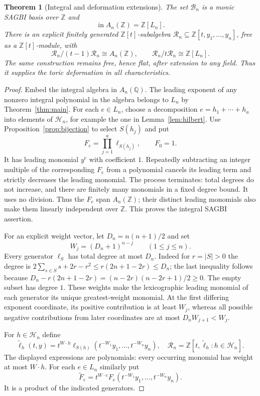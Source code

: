 \documentclass[11pt]{article}
\newtheorem{theorem}{Theorem}[section]
\theoremstyle{definition}
\theoremstyle{remark}
\newcommand{\Z}{\mathbb Z}
\newcommand{\Q}{\mathbb Q}
\newcommand{\inA}{\operatorname{in}}
\begin{document}
\begin{theorem}[Integral and deformation extensions]\label{thm:flat}
The set $\mathcal B_n$ is a monic SAGBI basis over $\Z$ and
\[
 \inA A_n(\Z)=\Z[L_n].
\]
There is an explicit finitely generated $\Z[t]$-subalgebra
$\mathcal R_n\subseteq\Z[t,y_1,\ldots,y_n]$, free as a $\Z[t]$-module,
with
\[
 \mathcal R_n/(t-1)\mathcal R_n\cong A_n(\Z),\qquad
 \mathcal R_n/t\mathcal R_n\cong\Z[L_n].
\]
The same construction remains free, hence flat, after extension to any
field. Thus it supplies the toric deformation in all characteristics.
\end{theorem}
\begin{proof}
Embed the integral algebra in $A_n(\Q)$. The leading exponent of any
nonzero integral polynomial in the algebra belongs to $L_n$ by
Theorem~\ref{thm:main}. For each $e\in L_n$, choose a decomposition
$e=h_1+\cdots+h_a$ into elements of $\mathcal H_n$, for example the one
in Lemma~\ref{lem:hilbert}. Use Proposition~\ref{prop:bijection} to select
$S(h_j)$ and put
\[
 F_e=\prod_{j=1}^a\ell_{S(h_j)},\qquad F_0=1.
\]
It has leading monomial $y^e$ with coefficient $1$.
Repeatedly subtracting an integer multiple of the corresponding $F_e$
from a polynomial cancels its leading term and strictly decreases the
leading monomial. The process terminates: total degrees do not increase,
and there are finitely many monomials in a fixed degree bound. It uses no
division. Thus the $F_e$ span $A_n(\Z)$; their distinct leading monomials
also make them linearly independent over $\Z$.
This proves the integral SAGBI assertion.

For an explicit weight vector, let $D_n=n(n+1)/2$ and set
\[
 W_j=(D_n+1)^{n-j}\qquad(1\le j\le n).
\]
Every generator $\ell_S$ has total degree at most $D_n$.
Indeed for $r=|S|>0$ the degree is
$2\sum_{s\in S}s+2r-r^2\le r(2n+1-2r)\le D_n$;
the last inequality follows because
$D_n-r(2n+1-2r)=(n-2r)(n-2r+1)/2\ge0$.
The empty subset has degree $1$.
These weights make the lexicographic leading monomial of each generator
its unique greatest-weight monomial. At the first differing exponent
coordinate, its positive contribution is at least $W_j$, whereas all
possible negative contributions from later coordinates are at most
$D_nW_{j+1}<W_j$.

For $h\in\mathcal H_n$ define
\[
 \widetilde\ell_h(t,y)=t^{W\cdot h}
      \ell_{S(h)}(t^{-W_1}y_1,\ldots,t^{-W_n}y_n),
 \quad
 \mathcal R_n=\Z[t,\widetilde\ell_h:h\in\mathcal H_n].
\]
The displayed expressions are polynomials: every occurring monomial has
weight at most $W\cdot h$. For each $e\in L_n$ similarly put
\[
 \widetilde F_e=t^{W\cdot e}F_e(t^{-W_1}y_1,\ldots,t^{-W_n}y_n).
\]
It is a product of the indicated generators.


\end{proof}
\end{document}
